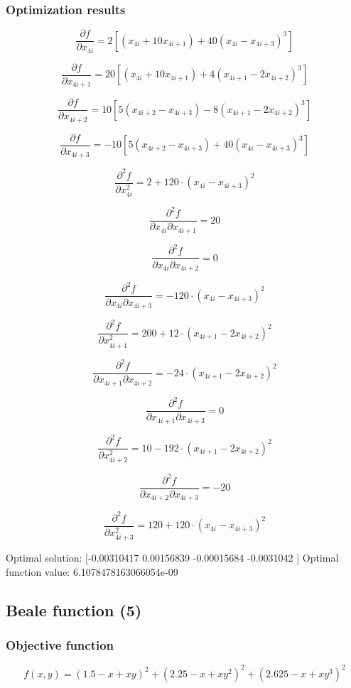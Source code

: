 \documentclass{article}
\begin{document}
\subsubsection{Optimization results}
$$
\frac{\partial f}{\partial x_{4i}} = 2 \left[(x_{4i} + 10x_{4i+1}) + 40(x_{4i} - x_{4i+3})^3\right]
$$

$$
\frac{\partial f}{\partial x_{4i+1}} = 20 \left[(x_{4i} + 10x_{4i+1}) + 4(x_{4i+1} - 2x_{4i+2})^3\right]
$$

$$
\frac{\partial f}{\partial x_{4i+2}} = 10 \left[5(x_{4i+2} - x_{4i+3}) - 8(x_{4i+1} - 2x_{4i+2})^3\right]
$$

$$
\frac{\partial f}{\partial x_{4i+3}} = -10 \left[5(x_{4i+2} - x_{4i+3}) + 40(x_{4i} - x_{4i+3})^3\right]
$$

$$
\frac{\partial^2 f}{\partial x_{4i}^2} = 2 + 120 \cdot (x_{4i} - x_{4i+3})^2
$$

$$
\frac{\partial^2 f}{\partial x_{4i} \partial x_{4i+1}} = 20
$$

$$
\frac{\partial^2 f}{\partial x_{4i} \partial x_{4i+2}} = 0
$$

$$
\frac{\partial^2 f}{\partial x_{4i} \partial x_{4i+3}} = -120 \cdot (x_{4i} - x_{4i+3})^2
$$

$$
\frac{\partial^2 f}{\partial x_{4i+1}^2} = 200 + 12 \cdot (x_{4i+1} - 2x_{4i+2})^2
$$

$$
\frac{\partial^2 f}{\partial x_{4i+1} \partial x_{4i+2}} = -24 \cdot (x_{4i+1} - 2x_{4i+2})^2
$$

$$
\frac{\partial^2 f}{\partial x_{4i+1} \partial x_{4i+3}} = 0
$$

$$
\frac{\partial^2 f}{\partial x_{4i+2}^2} = 10 - 192 \cdot (x_{4i+1} - 2x_{4i+2})^2
$$

$$
\frac{\partial^2 f}{\partial x_{4i+2} \partial x_{4i+3}} = -20
$$

$$
\frac{\partial^2 f}{\partial x_{4i+3}^2} = 120 + 120 \cdot (x_{4i} - x_{4i+3})^2
$$

Optimal solution: [-0.00310417  0.00156839 -0.00015684 -0.0031042 ]
Optimal function value: 6.1078478163066054e-09
\subsection{Beale function (5)}
\subsubsection{Objective function}
$$f(x, y) = (1.5 - x + xy)^2 + (2.25 - x + xy^2)^2 + (2.625 - x + xy^3)^2$$
\end{document}
